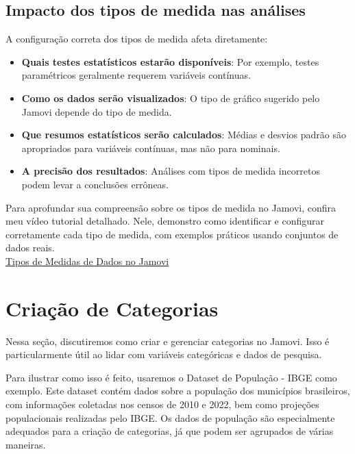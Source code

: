 \subsection{Impacto dos tipos de medida nas análises}

A configuração correta dos tipos de medida afeta diretamente:

\begin{itemize}
    \item \textbf{Quais testes estatísticos estarão disponíveis}: Por exemplo, testes paramétricos geralmente requerem variáveis contínuas.
    \item \textbf{Como os dados serão visualizados}: O tipo de gráfico sugerido pelo Jamovi depende do tipo de medida.
    \item \textbf{Que resumos estatísticos serão calculados}: Médias e desvios padrão são apropriados para variáveis contínuas, mas não para nominais.
    \item \textbf{A precisão dos resultados}: Análises com tipos de medida incorretos podem levar a conclusões errôneas.
\end{itemize}

\begin{tcolorbox}[colback=white,colframe=red,title={\faPlayCircle \ Dica de Conteúdo}]
  Para aprofundar sua compreensão sobre os tipos de medida no Jamovi, confira meu vídeo tutorial detalhado. Nele, demonstro como identificar e configurar corretamente cada tipo de medida, com exemplos práticos usando conjuntos de dados reais.\\
  \textcolor{red}{\faYoutube} \href{https://youtu.be/398uFqX7NRA?si=wSLiUl3nIaABU5KJ}{Tipos de Medidas de Dados no Jamovi}
\end{tcolorbox}

\section{Criação de Categorias}
Nessa seção, discutiremos como criar e gerenciar categorias no Jamovi. Isso é particularmente útil ao lidar com variáveis categóricas e dados de pesquisa.

Para ilustrar como isso é feito, usaremos o Dataset de População - IBGE como exemplo. Este dataset contém dados sobre a população dos municípios brasileiros, com informações coletadas nos censos de 2010 e 2022, bem como projeções populacionais realizadas pelo IBGE. Os dados de população são especialmente adequados para a criação de categorias, já que podem ser agrupados de várias maneiras.

